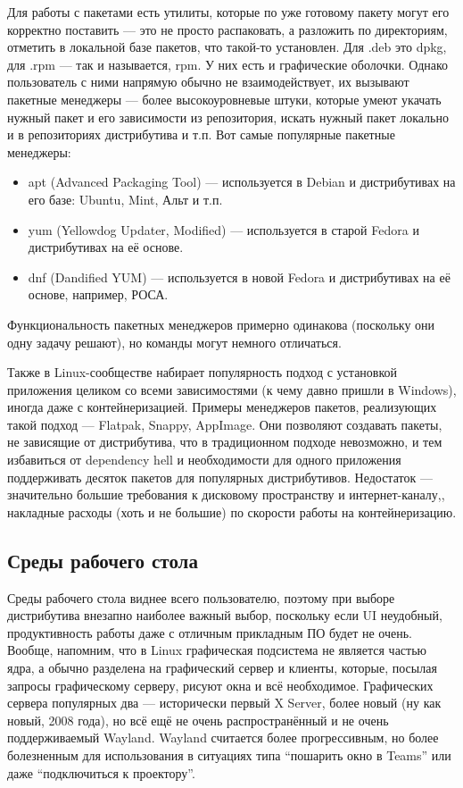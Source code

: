\documentclass{../../text-style}
\begin{document}
Для работы с пакетами есть утилиты, которые по уже готовому пакету могут его корректно поставить --- это не просто распаковать, а разложить по директориям, отметить в локальной базе пакетов, что такой-то установлен.
Для .deb это dpkg, для .rpm --- так и называется, rpm.
У них есть и графические оболочки.
Однако пользователь с ними напрямую обычно не взаимодействует, их вызывают пакетные менеджеры --- более высокоуровневые штуки, которые умеют укачать нужный пакет и его зависимости из репозитория, искать нужный пакет локально и в репозиториях дистрибутива и т.п.
Вот самые популярные пакетные менеджеры:

\begin{itemize}
    \item apt (Advanced Packaging Tool) --- используется в Debian и дистрибутивах на его базе: Ubuntu, Mint, Альт и т.п.
    \item yum (Yellowdog Updater, Modified) --- используется в старой Fedora и дистрибутивах на её основе.
    \item dnf (Dandified YUM) --- используется в новой Fedora и дистрибутивах на её основе, например, РОСА.
\end{itemize}

Функциональность пакетных менеджеров примерно одинакова (поскольку они одну задачу решают), но команды могут немного отличаться.

Также в Linux-сообществе набирает популярность подход с установкой приложения целиком со всеми зависимостями (к чему давно пришли в Windows), иногда даже с контейнеризацией.
Примеры менеджеров пакетов, реализующих такой подход --- Flatpak, Snappy, AppImage.
Они позволяют создавать пакеты, не зависящие от дистрибутива, что в традиционном подходе невозможно, и тем избавиться от dependency hell и необходимости для одного приложения поддерживать десяток пакетов для популярных дистрибутивов.
Недостаток --- значительно большие требования к дисковому пространству и интернет-каналу,, накладные расходы (хоть и не большие) по скорости работы на контейнеризацию.

\subsection{Среды рабочего стола}

Среды рабочего стола виднее всего пользователю, поэтому при выборе дистрибутива внезапно наиболее важный выбор, поскольку если UI неудобный, продуктивность работы даже с отличным прикладным ПО будет не очень.
Вообще, напомним, что в Linux графическая подсистема не является частью ядра, а обычно разделена на графический сервер и клиенты, которые, посылая запросы графическому серверу, рисуют окна и всё необходимое.
Графических сервера популярных два --- исторически первый X Server, более новый (ну как новый, 2008 года), но всё ещё не очень распространённый и не очень поддерживаемый Wayland.
Wayland считается более прогрессивным, но более болезненным для использования в ситуациях типа \enquote{пошарить окно в Teams} или даже \enquote{подключиться к проектору}.
\end{document}
